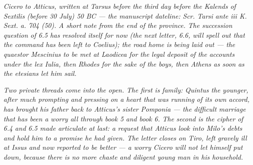 
\textit{Cicero to Atticus, written at Tarsus before
the third day before the Kalends of Sextilis (before 30
July) 50 BC --- the manuscript dateline: \textit{Scr.
Tarsi ante iii K. Sext. a. 704 (50)}. A short note
from the end of the province. The succession question
of 6.5 has resolved itself for now (the next letter,
6.6, will spell out that the command has been left to
Coelius); the road home is being laid out --- the
quaestor Mescinius to be met at Laodicea for the legal
deposit of the accounts under the lex Iulia, then
Rhodes for the sake of the boys, then Athens as soon as
the etesians let him sail.}

\textit{Two private threads come into the open. The
first is family: Quintus the younger, after much
prompting and pressing on a heart that was running of
its own accord, has brought his father back to Atticus's
sister Pomponia --- the difficult marriage that has
been a worry all through book 5 and book 6. The
second is the cipher of 6.4 and 6.5 made articulate at
last: a request that Atticus look into Milo's debts and
hold him to a promise he had given. The letter closes
on Tiro, left gravely ill at Issus and now reported to
be better --- a worry Cicero will not let himself put
down, because there is no more chaste and diligent
young man in his household.}
